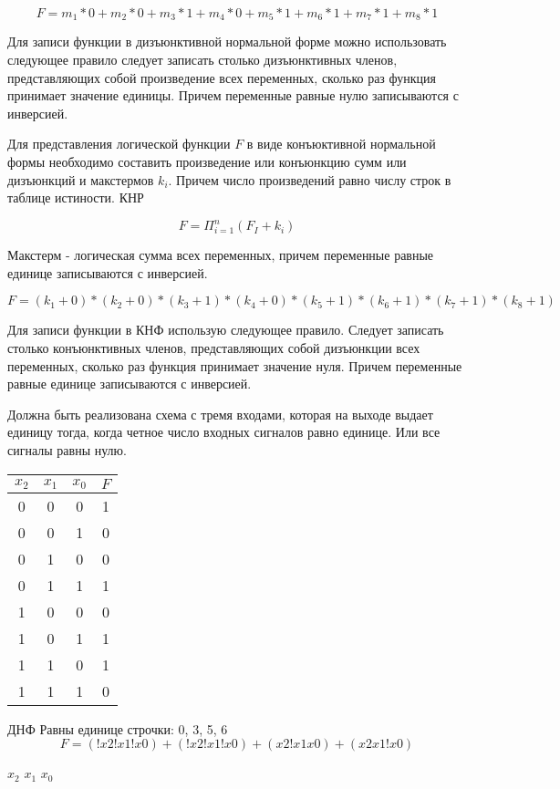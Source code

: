 \documentclass[a4paper]{article}
\begin{document}
$$ F = m_1*0 + m_2*0 + m_3*1 + m_4*0 + m_5*1 + m_6*1 + m_7*1 + m_8*1$$

Для записи функции в дизъюнктивной нормальной форме можно использовать следующее правило следует записать столько дизъюнктивных членов, представляющих собой произведение всех переменных, сколько раз функция принимает значение единицы. Причем переменные равные нулю записываются с инверсией.

Для представления логической функции $F$ в виде конъюктивной нормальной формы необходимо составить произведение или конъюнкцию сумм или дизъюнкций и макстермов $k_i$. Причем число произведений равно числу строк в таблице истиности.
КНР

$$ F = \Pi_{i=1}^n (F_I + k_i) $$

Макстерм - логическая сумма всех переменных, причем переменные равные единице записываются с инверсией.

$$ F = (k_1 + 0) * (k_2 + 0) * (k_3 + 1) * (k_4 + 0) * (k_5 + 1) * (k_6 + 1) * (k_7 + 1) * (k_8 + 1)$$

Для записи функции в КНФ использую следующее правило. Следует записать столько конъюнктивных членов, представляющих собой дизъюнкции всех переменных, сколько раз функция принимает значение нуля. Причем переменные равные единице записываются с инверсией.

Должна быть реализована схема с тремя входами, которая на выходе выдает единицу тогда, когда четное число входных сигналов равно единице.
Или все сигналы равны нулю.

\begin{table}[ht]
\centering
\begin{tabular}{|c|c|c|c|}
\hline
$x_2$ & $x_1$ & $x_0$ & $F$ \\
\hline
0 & 0 & 0 & 1 \\
0 & 0 & 1 & 0 \\
0 & 1 & 0 & 0 \\
0 & 1 & 1 & 1 \\
1 & 0 & 0 & 0 \\
1 & 0 & 1 & 1 \\
1 & 1 & 0 & 1 \\
1 & 1 & 1 & 0 \\
\hline
\end{tabular}
\end{table}

ДНФ
Равны единице строчки: 0, 3, 5, 6
$$ F = (!x2!x1!x0) + (!x2!x1!x0) + (x2!x1x0) + (x2x1!x0)$$

$ x_2 $
$ x_1 $
$ x_0 $
\end{document}
